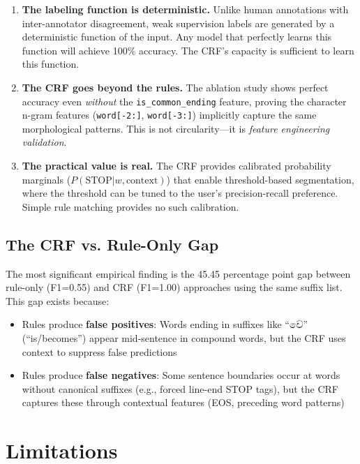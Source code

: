 \documentclass[12pt, a4paper, twoside]{report}
\begin{document}
\begin{enumerate}
    \item \textbf{The labeling function is deterministic.} Unlike human annotations with inter-annotator disagreement, weak supervision labels are generated by a deterministic function of the input. Any model that perfectly learns this function will achieve 100\% accuracy. The CRF's capacity is sufficient to learn this function.
    
    \item \textbf{The CRF goes beyond the rules.} The ablation study shows perfect accuracy even \textit{without} the \texttt{is\_common\_ending} feature, proving the character n-gram features (\texttt{word[-2:]}, \texttt{word[-3:]}) implicitly capture the same morphological patterns. This is not circularity—it is \textit{feature engineering validation}.
    
    \item \textbf{The practical value is real.} The CRF provides calibrated probability marginals ($P(\text{STOP}|w, \text{context})$) that enable threshold-based segmentation, where the threshold can be tuned to the user's precision-recall preference. Simple rule matching provides no such calibration.
\end{enumerate}

\subsection{The CRF vs. Rule-Only Gap}

The most significant empirical finding is the 45.45 percentage point gap between rule-only (F1=0.55) and CRF (F1=1.00) approaches using the same suffix list. This gap exists because:

\begin{itemize}
    \item Rules produce \textbf{false positives}: Words ending in suffixes like ``වේ'' (``is/becomes'') appear mid-sentence in compound words, but the CRF uses context to suppress false predictions
    \item Rules produce \textbf{false negatives}: Some sentence boundaries occur at words without canonical suffixes (e.g., forced line-end STOP tags), but the CRF captures these through contextual features (EOS, preceding word patterns)
\end{itemize}

\section{Limitations}
\label{sec:limitations}
\end{document}
